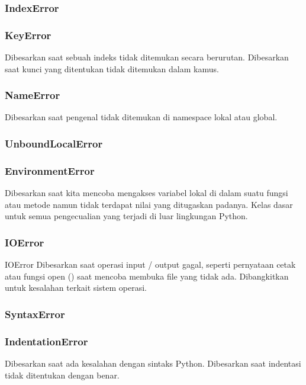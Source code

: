 \subsubsection{IndexError}

\subsubsection{KeyError}
Dibesarkan saat sebuah indeks tidak ditemukan secara berurutan. Dibesarkan saat kunci yang ditentukan tidak ditemukan dalam kamus.

\subsubsection{NameError}
Dibesarkan saat pengenal tidak ditemukan di namespace lokal atau global.

\subsubsection{UnboundLocalError}

\subsubsection{EnvironmentError}
Dibesarkan saat kita mencoba mengakses variabel lokal di dalam suatu fungsi atau metode namun tidak terdapat nilai yang ditugaskan padanya. Kelas dasar untuk semua pengecualian yang terjadi di luar lingkungan Python.

\subsubsection{IOError}
IOError Dibesarkan saat operasi input / output gagal, seperti pernyataan cetak atau fungsi open () saat mencoba membuka file yang tidak ada. Dibangkitkan untuk kesalahan terkait sistem operasi.

\subsubsection{SyntaxError} 
\subsubsection{IndentationError}
Dibesarkan saat ada kesalahan dengan sintaks Python.
Dibesarkan saat indentasi tidak ditentukan dengan benar. 


